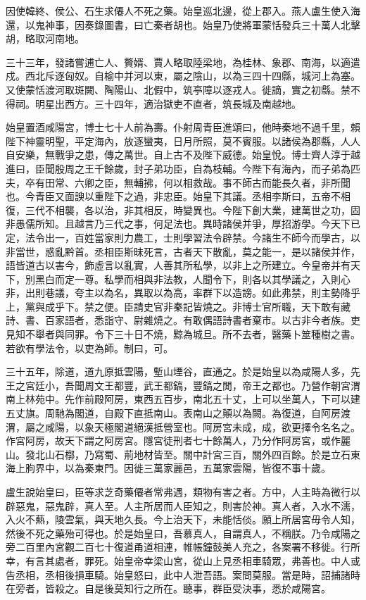 因使韓終、侯公、石生求僊人不死之藥。始皇巡北邊，從上郡入。燕人盧生使入海還，以鬼神事，因奏錄圖書，曰亡秦者胡也。始皇乃使將軍蒙恬發兵三十萬人北擊胡，略取河南地。

三十三年，發諸嘗逋亡人、贅婿、賈人略取陸梁地，為桂林、象郡、南海，以適遣戍。西北斥逐匈奴。自榆中并河以東，屬之陰山，以為三四十四縣，城河上為塞。又使蒙恬渡河取斑闕、陶陽山、北假中，筑亭障以逐戎人。徙謫，實之初縣。禁不得祠。明星出西方。三十四年，適治獄吏不直者，筑長城及南越地。

始皇置酒咸陽宮，博士七十人前為壽。仆射周青臣進頌曰，他時秦地不過千里，賴陛下神靈明聖，平定海內，放逐蠻夷，日月所照，莫不賓服。以諸侯為郡縣，人人自安樂，無戰爭之患，傳之萬世。自上古不及陛下威德。始皇悅。博士齊人淳于越進曰，臣聞殷周之王千餘歲，封子弟功臣，自為枝輔。今陛下有海內，而子弟為匹夫，卒有田常、六卿之臣，無輔拂，何以相救哉。事不師古而能長久者，非所聞也。今青臣又面諛以重陛下之過，非忠臣。始皇下其議。丞相李斯曰，五帝不相復，三代不相襲，各以治，非其相反，時變異也。今陛下創大業，建萬世之功，固非愚儒所知。且越言乃三代之事，何足法也。異時諸侯并爭，厚招游學。今天下已定，法令出一，百姓當家則力農工，士則學習法令辟禁。今諸生不師今而學古，以非當世，惑亂黔首。丞相臣斯昧死言，古者天下散亂，莫之能一，是以諸侯并作，語皆道古以害今，飾虛言以亂實，人善其所私學，以非上之所建立。今皇帝并有天下，別黑白而定一尊。私學而相與非法教，人聞令下，則各以其學議之，入則心非，出則巷議，夸主以為名，異取以為高，率群下以造謗。如此弗禁，則主勢降乎上，黨與成乎下。禁之便。臣請史官非秦記皆燒之。非博士官所職，天下敢有藏詩、書、百家語者，悉詣守、尉雜燒之。有敢偶語詩書者棄市。以古非今者族。吏見知不舉者與同罪。令下三十日不燒，黥為城旦。所不去者，醫藥卜筮種樹之書。若欲有學法令，以吏為師。制曰，可。

三十五年，除道，道九原抵雲陽，塹山堙谷，直通之。於是始皇以為咸陽人多，先王之宮廷小，吾聞周文王都豐，武王都鎬，豐鎬之閒，帝王之都也。乃營作朝宮渭南上林苑中。先作前殿阿房，東西五百步，南北五十丈，上可以坐萬人，下可以建五丈旗。周馳為閣道，自殿下直抵南山。表南山之顛以為闕。為復道，自阿房渡渭，屬之咸陽，以象天極閣道絕漢抵營室也。阿房宮未成，成，欲更擇令名名之。作宮阿房，故天下謂之阿房宮。隱宮徒刑者七十餘萬人，乃分作阿房宮，或作麗山。發北山石槨，乃寫蜀、荊地材皆至。關中計宮三百，關外四百餘。於是立石東海上朐界中，以為秦東門。因徙三萬家麗邑，五萬家雲陽，皆復不事十歲。

盧生說始皇曰，臣等求芝奇藥僊者常弗遇，類物有害之者。方中，人主時為微行以辟惡鬼，惡鬼辟，真人至。人主所居而人臣知之，則害於神。真人者，入水不濡，入火不爇，陵雲氣，與天地久長。今上治天下，未能恬倓。願上所居宮毋令人知，然後不死之藥殆可得也。於是始皇曰，吾慕真人，自謂真人，不稱朕。乃令咸陽之旁二百里內宮觀二百七十復道甬道相連，帷帳鐘鼓美人充之，各案署不移徙。行所幸，有言其處者，罪死。始皇帝幸梁山宮，從山上見丞相車騎眾，弗善也。中人或告丞相，丞相後損車騎。始皇怒曰，此中人泄吾語。案問莫服。當是時，詔捕諸時在旁者，皆殺之。自是後莫知行之所在。聽事，群臣受決事，悉於咸陽宮。

